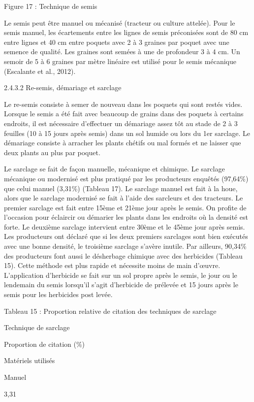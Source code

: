 \documentclass[12pt,oneside]{report}
\begin{document}
Figure 17 : Technique de semis

Le semis peut être manuel ou mécanisé (tracteur ou culture attelée). Pour le semis manuel, les écartements entre les lignes de semis préconisées sont de 80 cm entre lignes et 40 cm entre poquets avec 2 à 3 graines par poquet avec une semence de qualité. Les graines sont semées à une de profondeur 3 à 4 cm. Un semoir de 5 à 6 graines par mètre linéaire est utilisé pour le semis mécanique (Escalante et al., 2012).

2.4.3.2 Re-semis, démariage et sarclage

Le re-semis consiste à semer de nouveau dans les poquets qui sont restés vides. Lorsque le semis a été fait avec beaucoup de grains dans des poquets à certains endroits, il est nécessaire d’effectuer un démariage assez tôt au stade de 2 à 3 feuilles (10 à 15 jours après semis) dans un sol humide ou lors du 1er sarclage. Le démariage consiste à arracher les plants chétifs ou mal formés et ne laisser que deux plants au plus par poquet.

Le sarclage se fait de façon manuelle, mécanique et chimique. Le sarclage mécanique ou modernisé est plus pratiqué par les producteurs enquêtés (97,64\%) que celui manuel (3,31\%) (Tableau 17). Le sarclage manuel est fait à la houe, alors que le sarclage modernisé se fait à l’aide des sarcleurs et des tracteurs. Le premier sarclage est fait entre 15ème et 21ème jour après le semis. On profite de l’occasion pour éclaircir ou démarier les plants dans les endroits où la densité est forte. Le deuxième sarclage intervient entre 30ème et le 45ème jour après semis. Les producteurs ont déclaré que si les deux premiers sarclages sont bien exécutés avec une bonne densité, le troisième sarclage s’avère inutile. Par ailleurs, 90,34\% des producteurs font aussi le désherbage chimique avec des herbicides (Tableau 15). Cette méthode est plus rapide et nécessite moins de main d’œuvre. L’application d’herbicide se fait sur un sol propre après le semis, le jour ou le lendemain du semis lorsqu’il s’agit d’herbicide de prélevée et 15 jours après le semis pour les herbicides post levée.

Tableau 15 : Proportion relative de citation des techniques de sarclage

Technique de sarclage

Proportion de citation (\%)

Matériels utilisés

Manuel

3,31
\end{document}
